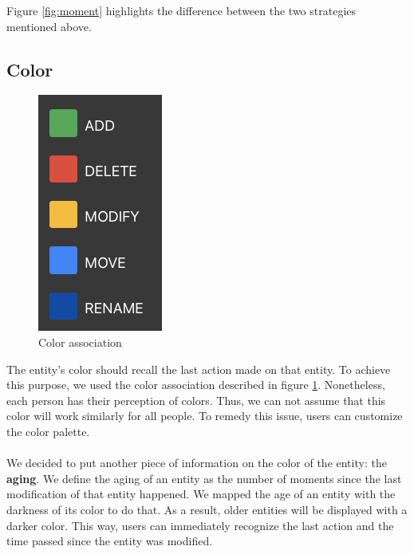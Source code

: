 Figure \ref{fig:moment} highlights the difference between the two strategies mentioned above. 

\subsection*{Color}
\begin{figure}
    \begin{center}
        \includegraphics[width=0.7\linewidth]{ColorAssociation.png} 
        \caption{Color association}
        \label{fig:ColorAssociation}
    \end{center}
\end{figure}

The entity's color should recall the last action made on that entity. To achieve this purpose, we used the color association described in figure \ref{fig:ColorAssociation}.
Nonetheless, each person has their perception of colors. Thus, we can not assume that this color will work similarly for all people.
To remedy this issue, users can customize the color palette. \\
\\
We decided to put another piece of information on the color of the entity: the \textbf{aging}. 
We define the aging of an entity as the number of moments since the last modification of that entity happened.
We mapped the age of an entity with the darkness of its color to do that. 
As a result, older entities will be displayed with a darker color. 
This way, users can immediately recognize the last action and the time passed since the entity was modified.


